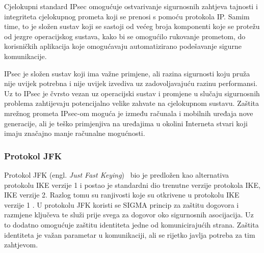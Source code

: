 Cjelokupni standard IPsec omogućuje ostvarivanje sigurnosnih zahtjeva tajnosti i
integriteta cjelokupnog prometa koji se prenosi s pomoću protokola IP. Samim
time, to je složen sustav koji se sastoji od većeg broja komponenti koje se
protežu od jezgre operacijskog sustava, kako bi se omogućilo rukovanje
prometom, do korisničkih aplikacija koje omogućavaju automatizirano podešavanje
sigurne komunikacije.

IPsec je složen sustav koji ima važne primjene, ali razina sigurnosti koju pruža
nije uvijek potrebna i nije uvijek izvediva uz zadovoljavajuću razinu
performansi. Uz to IPsec je čvrsto vezan uz operacijski sustav i promjene u
slučaju sigurnosnih problema zahtijevaju potencijalno velike zahvate na
cjelokupnom sustavu. Zaštita mrežnog prometa IPsec-om moguća je između računala i
mobilnih uređaja nove generacije, ali je teško primjenjiva na uređajima u
okolini Interneta stvari koji imaju značajno manje računalne mogućnosti.

\subsubsection{Protokol JFK}
\label{sec:jfk}

Protokol JFK (engl. \emph{Just Fast Keying})~\cite{aiello2004jfk} bio je
predložen kao alternativa protokolu IKE verzije 1 i postao je standardni dio
trenutne verzije protokola IKE, IKE verzije 2. Razlog tomu su ranjivosti koje su
otkrivene u protokolu IKE verzije 1 \cite{canetti2002verif}. U protokolu JFK koristi se
SIGMA princip za zaštitu dogovora i razmjene ključeva te služi prije svega za
dogovor oko sigurnosnih asocijacija. Uz to dodatno omogućuje zaštitu identiteta
jedne od komunicirajućih strana. Zaštita identiteta je važan parametar u
komunikaciji, ali se rijetko javlja potreba za tim zahtjevom.


